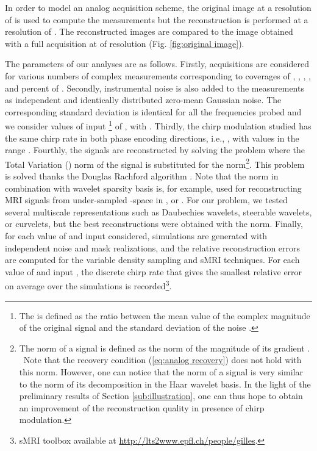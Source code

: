 \documentclass[10pt,draftcls, onecolumn]{IEEEtran}
\begin{document}
In order to model an analog acquisition scheme, the original image at a resolution of  is used to compute the measurements but the reconstruction is performed at a resolution of . The reconstructed images are compared to the image obtained with a full acquisition at  of resolution (Fig. \ref{fig:original image}).

The parameters of our analyses are as follows. Firstly, acquisitions are considered for various numbers  of complex measurements corresponding to coverages of , , , ,  and  percent of . Secondly, instrumental noise is also added to the measurements as independent and identically distributed zero-mean Gaussian noise. The corresponding standard deviation  is identical for all the frequencies probed and we consider values of input \footnote{The  is defined as the ratio between the mean value of the complex magnitude of the original signal and the standard deviation of the noise .} of , with . Thirdly, the chirp modulation studied has the same chirp rate  in both phase encoding directions, i.e., , with values in the range . Fourthly, the signals are reconstructed by solving the  problem where the Total Variation () norm of the signal  is substituted for the  norm\footnote{The  norm of a signal is defined as the  norm of the magnitude of its gradient \cite{candes06a, rudin92}. \ Note that the recovery condition (\ref{eq:analog recovery}) does not hold with this norm. However, one can notice that the  norm of a signal  is very similar to the  norm of its decomposition in the Haar wavelet basis. In the light of the preliminary results of Section \ref{sub:illustration}, one can thus hope to obtain an improvement of the reconstruction quality in presence of chirp modulation.}. This problem is solved thanks the Douglas Rachford algorithm \cite{combettes11, fadili09}. Note that the  norm in combination with wavelet sparsity basis is, for example, used for reconstructing MRI signals from under-sampled -space in \cite{lustig07, liang09a}, or \cite{kern11}. For our problem, we tested several multiscale representations such as Daubechies wavelets, steerable wavelets, or curvelets, but the best reconstructions were obtained with the  norm. Finally, for each value of  and input  considered,  simulations are generated with independent noise and mask realizations, and the relative reconstruction errors  are computed for the variable density sampling and sMRI techniques. For each value of  and input , the discrete chirp rate  that gives the smallest relative error on average over the  simulations is recorded\footnote{sMRI toolbox available at \url{http://lts2www.epfl.ch/people/gilles}.}.
\end{document}
